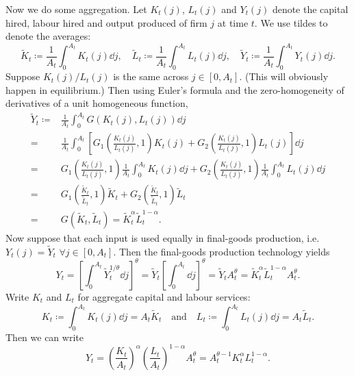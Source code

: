 \documentclass[11pt,letterpaper,reqno,oneside]{article}
\begin{document}
Now we do some aggregation. Let $K_t(j)$, $L_t(j)$ and $Y_t(j)$ denote the capital hired, labour hired and output produced of firm $j$ at time $t$. We use tildes to denote the averages:
%
\begin{equation*}
	\widetilde{K}_t 
	\coloneqq \frac{1}{A_t} \int_0^{A_t} K_t(j) \dd j
	,\quad
	\widetilde{L}_t 
	\coloneqq \frac{1}{A_t} \int_0^{A_t} L_t(j) \dd j
	,\quad
	\widetilde{Y}_t 
	\coloneqq \frac{1}{A_t} \int_0^{A_t} Y_t(j) \dd j .
\end{equation*}
%
Suppose $K_t(j)/L_t(j)$ is the same across $j \in [0,A_t]$. (This will obviously happen in equilibrium.) Then using Euler's formula and the zero-homogeneity of derivatives of a unit homogeneous function, 
%
\begin{align*}
	\widetilde{Y}_t 
	\coloneqq{}& \frac{1}{A_t} \int_0^{A_t} 
	G(K_t(j),L_t(j)) \dd j 
	\\
	={}& \frac{1}{A_t} \int_0^{A_t} 
	\left[ G_1\left(\frac{K_t(j)}{L_t(j)},1\right) K_t(j) 
	+ G_2\left(\frac{K_t(j)}{L_t(j)},1\right) L_t(j) \right] \dd j 
	\\
	={}& G_1\left(\frac{K_t(j)}{L_t(j)},1\right) 
	\frac{1}{A_t} \int_0^{A_t} K_t(j) \dd j 
	+ G_2\left(\frac{K_t(j)}{L_t(j)},1\right) 
	\frac{1}{A_t} \int_0^{A_t} L_t(j) \dd j 
	\\
	={}& G_1\left(\frac{\widetilde{K}_t}{\widetilde{L}_t},1\right) 
	\widetilde{K}_t 
	+ G_2\left(\frac{\widetilde{K}_t}{\widetilde{L}_t},1\right) 
	\widetilde{L}_t
	\\
	={}& G\left( \widetilde{K}_t, \widetilde{L}_t \right)
	= \widetilde{K}_t^\alpha \widetilde{L}_t^{1-\alpha} .
\end{align*}
%
Now suppose that each input is used equally in final-goods production, i.e. $Y_t(j)=\widetilde{Y}_t$ $\forall j \in [0,A_t]$. Then the final-goods production technology yields
%
\begin{equation*}
	Y_t 
	= \left[ \int_0^{A_t} \widetilde{Y}_t^{1/\theta} \dd j \right]^\theta 
	= \widetilde{Y}_t \left[ \int_0^{A_t} \dd j \right]^\theta 
	= \widetilde{Y}_t A_t^\theta 
	= \widetilde{K}_t^\alpha \widetilde{L}_t^{1-\alpha} A_t^\theta .
\end{equation*}
%
Write $K_t$ and $L_t$ for aggregate capital and labour services:
%
\begin{equation*}
	K_t \coloneqq \int_0^{A_t} K_t(j) \dd j = A_t \widetilde{K}_t
	\quad\text{and}\quad
	L_t \coloneqq \int_0^{A_t} L_t(j) \dd j = A_t \widetilde{L}_t .
\end{equation*}
%
Then we can write
%
\begin{equation*}
	Y_t 
	= \left(\frac{K_t}{A_t}\right)^\alpha 
	\left(\frac{L_t}{A_t}\right)^{1-\alpha}
	A_t^\theta
	= A_t^{\theta-1} K_t^\alpha L_t^{1-\alpha} .
\end{equation*}
\end{document}
